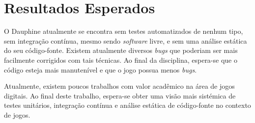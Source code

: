 \chapter[Resultados Esperados]{Resultados Esperados}

O Dauphine atualmente se encontra sem testes automatizados de nenhum tipo, sem integração contínua, mesmo sendo \textit{software} livre, e sem uma análise estática do seu código-fonte. Existem atualmente diversos \textit{bugs} que poderiam ser mais facilmente corrigidos com tais técnicas. Ao final da disciplina, espera-se que o código esteja mais manutenível e que o jogo possua menos \textit{bugs}.

Atualmente, existem poucos trabalhos com valor acadêmico na área de jogos digitais. Ao final deste trabalho, espera-se obter uma visão mais sistémica de testes unitários, integração contínua e análise estática de código-fonte no contexto de jogos. 
